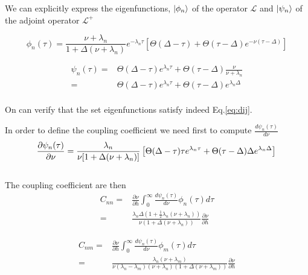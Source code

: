 \documentclass[12pt,twoside]{report}
\begin{document}
We can explicitly express the eigenfunctions, $\ket{\phi_n}$ of the operator $\mathcal{L}$ and $\ket{\psi_n}$ of  the adjoint operator $\mathcal{L}^+$


\begin{equation}
\phi_n(\tau)= \frac{\nu+\lambda_n}{1+\Delta(\nu+\lambda_n)}e^{-\lambda_n\tau}\left[\Theta(\Delta-\tau) +  \Theta(\tau-\Delta)e^{-\nu(\tau-\Delta)}\right]
\end{equation}


\begin{align}
\psi_n(\tau)=&\Theta(\Delta-\tau)e^{\lambda_n\tau} +  \Theta(\tau-\Delta) \frac{\nu}{\nu+\lambda_n}\\
=&\Theta(\Delta-\tau)e^{\lambda_n\tau} +  \Theta(\tau-\Delta)e^{\lambda_n\Delta}
\end{align}\\

On can verify that the set eigenfunctions satisfy indeed Eq.\eqref{eq:dij}.

In order to define the coupling coefficient we need first to compute $\frac{d\psi_n(\tau)}{d\nu}$ 
\begin{equation}
\frac{\partial\psi_n(\tau)}{\partial\nu}=\frac{\lambda_n}{\nu[1+\Delta(\nu+\lambda_n)]}\left[\Theta(\Delta-\tau)\tau e^{\lambda_n\tau} +  \Theta(\tau-\Delta)\Delta e^{\lambda_n\Delta}\right]\\
\end{equation}\\

The coupling coefficient are then 
\begin{align}
C_{nn}=&\frac{\partial \nu}{\partial h}\int_0^\infty\frac{d\psi_n(\tau)}{d\nu}\phi_n(\tau)d\tau \nonumber\\
=&\frac{\lambda_n\Delta(1+\frac{1}{2}\lambda_n(\nu+\lambda_n))}{\nu(1+\Delta(\nu+\lambda_n))}\frac{\partial \nu}{\partial h}
\end{align}


\begin{align}
C_{nm}=&\frac{\partial \nu}{\partial h}\int_0^\infty\frac{d\psi_n(\tau)}{d\nu}\phi_m(\tau)d\tau \nonumber\\
=&\frac{\lambda_n(\nu+\lambda_m)}{\nu(\lambda_n-\lambda_m)(\nu+\lambda_n)(1+\Delta(\nu+\lambda_m))}\frac{\partial \nu}{\partial h}
\end{align}
\end{document}
